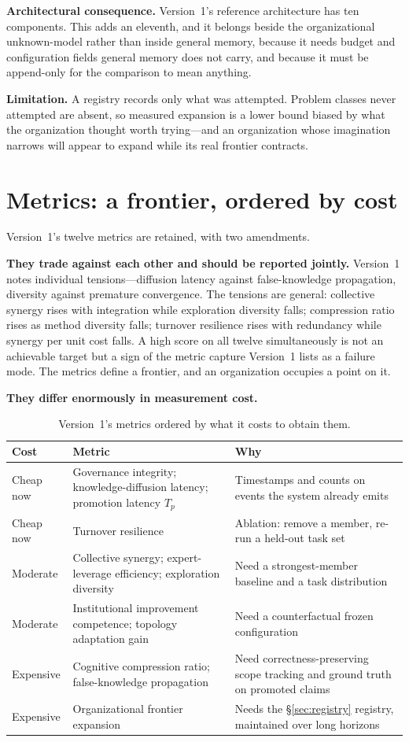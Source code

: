 \documentclass[11pt]{article}
\newcommand{\Tp}{\ensuremath{T_p}}
\begin{document}
\textbf{Architectural consequence.} Version~1's reference architecture has ten components. This adds an eleventh, and it belongs beside the organizational unknown-model rather than inside general memory, because it needs budget and configuration fields general memory does not carry, and because it must be append-only for the comparison to mean anything.

\textbf{Limitation.} A registry records only what was attempted. Problem classes never attempted are absent, so measured expansion is a lower bound biased by what the organization thought worth trying---and an organization whose imagination narrows will appear to expand while its real frontier contracts.

\section{Metrics: a frontier, ordered by cost}

Version~1's twelve metrics are retained, with two amendments.

\textbf{They trade against each other and should be reported jointly.} Version~1 notes individual tensions---diffusion latency against false-knowledge propagation, diversity against premature convergence. The tensions are general: collective synergy rises with integration while exploration diversity falls; compression ratio rises as method diversity falls; turnover resilience rises with redundancy while synergy per unit cost falls. A high score on all twelve simultaneously is not an achievable target but a sign of the metric capture Version~1 lists as a failure mode. The metrics define a frontier, and an organization occupies a point on it.

\textbf{They differ enormously in measurement cost.}

\begin{table}[h]
\centering\small
\begin{tabularx}{\textwidth}{@{}lYY@{}}
\toprule
Cost & Metric & Why \\
\midrule
Cheap now & Governance integrity; knowledge-diffusion latency; promotion latency $\Tp$ & Timestamps and counts on events the system already emits \\
Cheap now & Turnover resilience & Ablation: remove a member, re-run a held-out task set \\
Moderate  & Collective synergy; expert-leverage efficiency; exploration diversity & Need a strongest-member baseline and a task distribution \\
Moderate  & Institutional improvement competence; topology adaptation gain & Need a counterfactual frozen configuration \\
Expensive & Cognitive compression ratio; false-knowledge propagation & Need correctness-preserving scope tracking and ground truth on promoted claims \\
Expensive & Organizational frontier expansion & Needs the \S\ref{sec:registry} registry, maintained over long horizons \\
\bottomrule
\end{tabularx}
\caption{Version~1's metrics ordered by what it costs to obtain them.}
\end{table}
\end{document}
